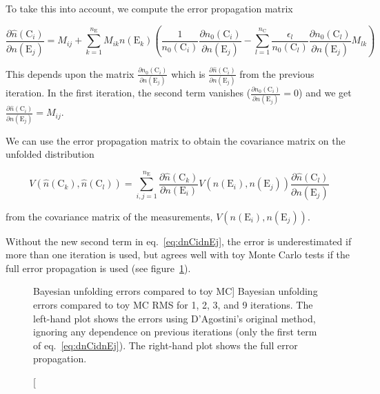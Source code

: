 \documentclass[12pt,a4paper]{article}
\newcommand{\E}{\mathrm{E}}
\newcommand{\C}{\mathrm{C}}
\newcommand{\dd}[2]{\frac{\partial{#1}}{\partial{#2}}}
\begin{document}
To take this into account, we compute the error propagation matrix

\begin{equation}
\dd{\hat{n}(\C_i)}{n(\E_j)} = M_{ij} + \sum_{k=1}^{n_{\E}} M_{ik} n(\E_k)
\left( \frac{1}{n_0(\C_i)} \dd{n_0(\C_i)}{n(\E_j)} - \sum_{l=1}^{n_{\C}} \frac{\epsilon_l}{n_0(\C_l)} \dd{n_0(\C_l)}{n(\E_j)} M_{lk} \right)
\label{eq:dnCidnEj}
\end{equation}

This depends upon the matrix $\dd{n_0(\C_i)}{n(\E_j)}$ which is $\dd{\hat{n}(\C_i)}{n(\E_j)}$ from the previous iteration.
In the first iteration, the second term vanishes ($\dd{n_0(\C_i)}{n(\E_j)}=0$) and we get $\dd{\hat{n}(\C_i)}{n(\E_j)} = M_{ij}$.

We can use the error propagation matrix to obtain the covariance matrix on the unfolded distribution

\begin{equation}
V(\hat{n}(\C_k),\hat{n}(\C_l)) = \sum_{i,j=1}^{n_{\E}} \dd{\hat{n}(\C_k)}{n(\E_i)} V(n(\E_i),n(\E_j)) \dd{\hat{n}(\C_l)}{n(\E_j)}
\label{eq:Vij}
\end{equation}

\noindent from the covariance matrix of the measurements, $V(n(\E_i),n(\E_j))$.

Without the new second term in eq.~\ref{eq:dnCidnEj},
the error is underestimated if more than one iteration
is used, but agrees well with toy Monte Carlo tests if the full error propagation is used
(see figure~\ref{fig:bayes_errors}).%
\begin{figure}[ht]
%
\caption
[Bayesian unfolding errors compared to toy MC]%
{Bayesian unfolding errors compared to toy MC RMS for 1, 2, 3, and 9 iterations.
The left-hand plot shows the errors using D'Agostini's original method,
ignoring any dependence on previous iterations (only the first term of eq.~\ref{eq:dnCidnEj}).
The right-hand plot shows the full error propagation.}%
\label{fig:bayes_errors}%
\end{figure}
\end{document}
